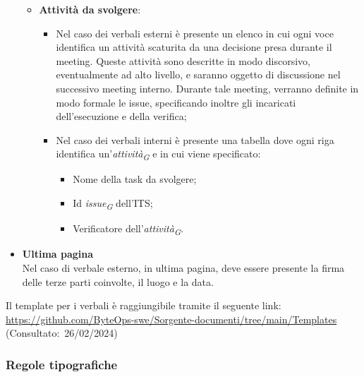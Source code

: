 \begin{itemize}
\begin{itemize}
            \item \textbf{Attività da svolgere}:
            \begin{itemize}
                \item Nel caso dei verbali esterni è presente un elenco in cui ogni voce identifica un attività scaturita da una decisione presa durante il meeting. Queste attività sono descritte in modo discorsivo, eventualmente ad alto livello, e saranno oggetto di discussione nel successivo meeting interno. Durante tale meeting, verranno definite in modo formale le issue, specificando inoltre gli incaricati dell'esecuzione e della verifica;
                \item Nel caso dei verbali interni è presente una tabella dove ogni riga identifica un'\textit{attività}\textsubscript{\textit{G}} e in cui viene specificato:
                    \begin{itemize}
                        \item Nome della task da svolgere;
                        \item Id \textit{issue}\textsubscript{\textit{G}} dell'ITS;
                        \item Verificatore dell'\textit{attività}\textsubscript{\textit{G}}.
                    \end{itemize}
            \end{itemize}
            
        \end{itemize}
    \item \textbf{Ultima pagina} \\
        Nel caso di verbale esterno, in ultima pagina, deve essere presente la firma delle terze parti coinvolte, il luogo e la data.
\end{itemize}

Il template per i verbali è raggiungibile tramite il seguente link: \url{https://github.com/ByteOps-swe/Sorgente-documenti/tree/main/Templates} (Consultato:~26/02/2024)

\subsubsection{Regole tipografiche}
